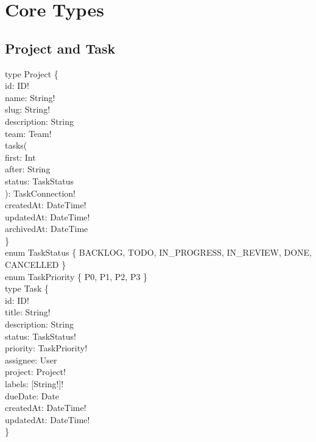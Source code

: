 \section*{Core Types}

\subsection*{Project and Task}

\begin{schemabox}[title=Project \& Task Type Definitions]
type Project \{\\
\quad id:           ID!\\
\quad name:         String!\\
\quad slug:         String!\\
\quad description:  String\\
\quad team:         Team!\\
\quad tasks(\\
\qquad first:   Int\\
\qquad after:   String\\
\qquad status:  TaskStatus\\
\quad ):            TaskConnection!\\
\quad createdAt:    DateTime!\\
\quad updatedAt:    DateTime!\\
\quad archivedAt:   DateTime\\
\}\\[2pt]
enum TaskStatus \{ BACKLOG, TODO, IN\_PROGRESS, IN\_REVIEW, DONE, CANCELLED \}\\[2pt]
enum TaskPriority \{ P0, P1, P2, P3 \}\\[2pt]
type Task \{\\
\quad id:            ID!\\
\quad title:         String!\\
\quad description:   String\\
\quad status:        TaskStatus!\\
\quad priority:      TaskPriority!\\
\quad assignee:      User\\
\quad project:       Project!\\
\quad labels:        [String!]!\\
\quad dueDate:       Date\\
\quad createdAt:     DateTime!\\
\quad updatedAt:     DateTime!\\
\}
\end{schemabox}

